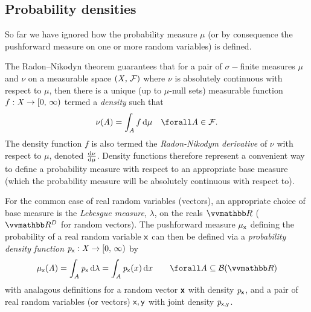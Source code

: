 \subsection{Probability densities}\label{subsec:probability-densities}

So far we have ignored how the probability measure $\mu$ (or by consequence the pushforward measure on one or more random variables) is defined. 

The Radon--Nikodyn theorem \citep{} guarantees that for a pair of $\sigma-$finite measures $\mu$ and $\nu$ on a measurable space $(\mathit{X},\,\mathcal{F})$ where $\nu$ is absolutely continuous with respect to $\mu$,  then there is a unique (up to $\mu$-null sets) measurable function $f : \mathit{X} \to [0,\,\infty)$ termed a \emph{density} such that
\begin{equation}
  \nu(\set{A}) = \int_{\set{A}} f\,\dr\mu
  \quad \forall \set{A} \in \sset{F}.
\end{equation}
The density function $f$ is also termed the \emph{Radon-Nikodym derivative} of $\nu$ with respect to $\mu$, denoted $\frac{\mathrm{d} \nu}{\mathrm{d} \mu}$. Density functions therefore represent a convenient way to define a probability measure with respect to an appropriate base measure (which the probability measure will be absolutely continuous with respect to).

For the common case of real random variables (vectors), an appropriate choice of base measure is the \emph{Lebesgue measure}, $\lambda$, on the reals $\reals$ ($\reals^D$ for random vectors). The pushforward measure $\mu_{\mathsf{x}}$ defining the probability of a real random variable $\mathsf{x}$ can then be defined via a \emph{probability density function} $\mathit{p}_{\mathsf{x}} : \mathit{X} \to [0,\,\infty)$ by
\begin{equation}\label{eq:real-rv-prob-dens}
    \mu_{\rvar{x}}(\set{A})
    = \int_{\set{A}} \pdennoarg{\rvar{x}} \,\dr\lambda
    = \int_{\set{A}} \pden{\rvar{x}}{x} \,\dr x
    \qquad
    \forall \set{A} \subseteq \sset{B}(\reals)
\end{equation}
with analagous definitions for a random vector $\boldsymbol{\mathsf{x}}$ with density $\mathit{p}_{\boldsymbol{\mathsf{x}}}$, and a pair of real random variables (or vectors) $\mathsf{x},\mathsf{y}$ with joint density $\mathit{p}_{\mathsf{x},\mathsf{y}}$. 

